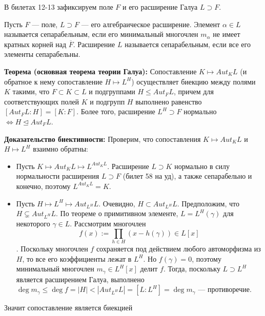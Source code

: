 \par В билетах 12-13 зафиксируем поле $F$ и его расширение Галуа $L \supset F$.
\par \Def Пусть $F$ — поле, $L \supset F$ — его алгебраическое расширение. Элемент $\alpha \in L$ называется сепарабельным, если его минимальный многочлен $m_\alpha$ не имеет кратных
корней над $\overline{F}$. Расширение $L$ называется сепарабельным, если все его элементы сепарабельны.

\par \textbf{Теорема (основная теорема теории Галуа):} Сопоставление $K \mapsto Aut_K L$ (и обратное к нему сопоставление $H \mapsto L^H$) осуществляет биекцию между полями $K$ такими, что
$F \subset K \subset L$ и подгруппами $H \leq Aut_F L$, причем для соответствующих полей $K$ и
подгрупп $H$ выполнено равенство $[Aut_F L : H]=[K:F]$. Более того, расширение $L^H \supset F$ нормально $\Leftrightarrow H \trianglelefteq Aut_F L$.
\par \textbf{Доказательство биективности:} \Proof Проверим, что сопоставления $K \mapsto Aut_K L$ и $H \mapsto L^H$ взаимно обратны:
\begin{itemize}
    \item Пусть $K \mapsto Aut_K L \mapsto L^{Aut_K L}$. Расширение $L \supset K$ нормально в силу нормальности расширения $L \supset F$ (билет 58 на уд), а также сепарабельно и конечно, поэтому $L^{Aut_K L}=K$.
    
    \item Пусть $H \mapsto L^H \mapsto Aut_{L^H} L$. Очевидно, $H \subset Aut_{L^H} L$. Предположим, что $H \subsetneq Aut_{L^H} L$. По теореме о примитивном элементе, $L=L^H(\gamma)$ для некоторого $\gamma \in L$. Рассмотрим многочлен $$f(x):= \prod_{h \in H} (x-h(\gamma)) \in L[x]$$. Поскольку многочлен $f$ сохраняется под действием любого автоморфизма из $H$, то все его коэффициенты лежат в $L^H$. Но $f(\gamma)=0$, поэтому минимальный многочлен $m_\gamma \in L^H[x]$ делит $f$. Тогда, поскольку $L \supset L^H$ является расширением Галуа, выполнено $\deg m_\gamma \leq \deg f = |H| < |Aut_{L^H} L|=[L:L^H]=\deg m_\gamma$ — противоречие. 
\end{itemize}
\par Значит сопоставление является биекцией \EndProof